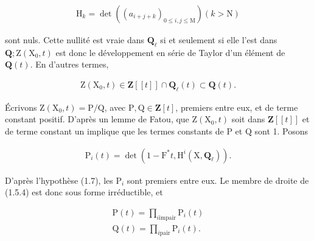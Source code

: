 \documentclass[10pt,leqno]{article}
\begin{document}
\begin{equation*}\begin{gathered}\mathrm{H}_{k} = \operatorname{det}((a_{i+j+k})_{0\leq i,j\leq \mathrm{M}})    (k>\mathrm{N})\end{gathered}\end{equation*}

\noindent sont nuls. Cette nullité est vraie dans \(\mathbf{Q}_{\ell }\) si et seulement si elle l’est dans \(\mathbf{Q}; \mathrm{Z}(\mathrm{X}_{0},t)\) est donc le développement en série de Taylor d’un élément de \(\mathbf{Q}(t)\). En d’autres termes,\par

\begin{equation*}\begin{gathered}\mathrm{Z}(\mathrm{X}_{0},t) \in  \mathbf{Z}[[t]] \cap  \mathbf{Q}_{\ell }(t) \subset  \mathbf{Q}(t).\end{gathered}\end{equation*}

\noindent Écrivons \(\mathrm{Z}(\mathrm{X}_{0},t)=\mathrm{P}/\mathrm{Q}\), avec \(\mathrm{P},\mathrm{Q}\in \mathbf{Z}[t]\), premiers entre eux, et de terme constant positif. D’après un lemme de Fatou, que \(\mathrm{Z}(\mathrm{X}_{0},t)\) soit dans \(\mathbf{Z}[[t]]\) et de terme constant un implique que les termes constants de \(\mathrm{P}\) et \(\mathrm{Q}\) sont 1. Posons\par

\begin{equation*}\begin{gathered}\mathrm{P}_{i}(t)=\operatorname{det}(1- \mathrm{F}^{*}t, \mathrm{H}^{i}(\mathrm{X},\mathbf{Q}_{\ell })).\end{gathered}\end{equation*}

\clearpage

\label{physical-6}\par\smallskip

\noindent D’après l’hypothèse (1.7), les \(\mathrm{P}_{i}\) sont premiers entre eux. Le membre de droite de (1.5.4) est donc sous forme irréductible, et\par

\begin{equation*}\begin{gathered}\mathrm{P}(t) = \prod _{i \text{impair}} \mathrm{P}_{i}(t) \\ \mathrm{Q}(t) = \prod _{i \text{pair}} \mathrm{P}_{i}(t).\end{gathered}\end{equation*}
\end{document}
